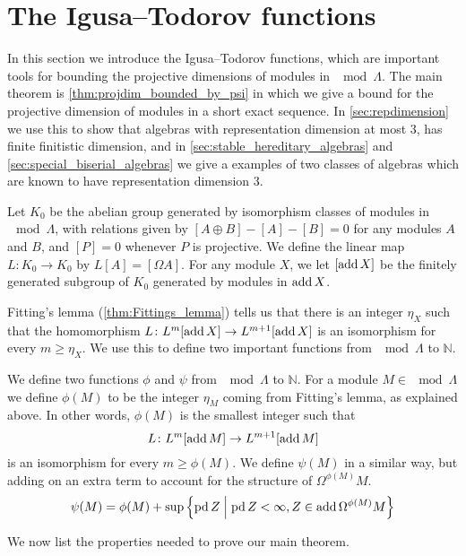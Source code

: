 \section{The Igusa--Todorov functions} \label{sec:Igusa-Todorov}

In this section we introduce the Igusa--Todorov functions, which are important tools for bounding the projective dimensions of modules in $\mod \Lambda$. The main theorem is \cref{thm:projdim_bounded_by_psi} in which we give a bound for the projective dimension of modules in a short exact sequence. In \cref{sec:repdimension} we use this to show that algebras with representation dimension at most 3, has finite finitistic dimension, and in \cref{sec:stable_hereditary_algebras} and \cref{sec:special_biserial_algebras} we give a examples of two classes of algebras which are known to have representation dimension 3.

Let $K_0$ be the abelian group generated by isomorphism classes of modules in $\mod\Lambda$, with relations given by $[A\oplus B] - [A] - [B] = 0$ for any modules $A$ and $B$, and $[P]=0$ whenever $P$ is projective. We define the linear map $L\colon K_0\to K_0$ by $L[A] = [\Omega A]$. For any module $X$, we let $[\operatorname{add} X]$ be the finitely generated subgroup of $K_0$ generated by modules in $\operatorname{add} X$. 

Fitting's lemma (\cref{thm:Fittings_lemma}) tells us that there is an integer $\eta_X$ such that the homomorphism $L\colon L^m[\operatorname{add} X] \to L^{m+1}[\operatorname{add} X]$ is an isomorphism for every $m \geq \eta_X$. We use this to define two important functions from $\mod \Lambda$ to $\mathbb N$.

\begin{defn}
	We define two functions $\phi$ and $\psi$ from $\mod\Lambda$ to $\mathbb N$. For a module $M \in \mod\Lambda$ we define $\phi(M)$ to be the integer $\eta_M$ coming from Fitting's lemma, as explained above. In other words, $\phi(M)$ is the smallest integer such that $$L\colon L^m[\operatorname{add} M] \to L^{m+1}[\operatorname{add} M]$$ is an isomorphism for every $m \geq \phi(M)$. We define $\psi(M)$ in a similar way, but adding on an extra term to account for the structure of $\Omega^{\phi(M)}M$. 
	$$\psi(M) = \phi(M) + \sup\left\lbrace\operatorname{pd} Z \; \middle| \; \operatorname{pd} Z < \infty, Z \in \operatorname{add} \Omega^{\phi(M)}M\right\rbrace$$
\end{defn}

We now list the properties needed to prove our main theorem.

